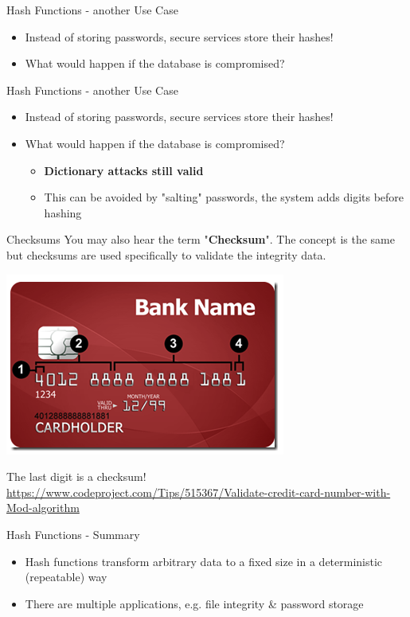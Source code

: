 \documentclass{beamer}
\begin{document}
\begin{frame}{Hash Functions - another Use Case}
\begin{itemize}
\item Instead of storing passwords, secure services store their hashes!
\item What would happen if the database is compromised?
\end{itemize}
\end{frame}

\begin{frame}{Hash Functions - another Use Case}
\begin{itemize}
\item Instead of storing passwords, secure services store their hashes!
\item What would happen if the database is compromised?
\begin{itemize}
\item \textbf{Dictionary attacks still valid}
\item This can be avoided by "salting" passwords, the system adds digits before hashing
\end{itemize}
\end{itemize}
\end{frame}

\begin{frame}{Checksums}
You may also hear the term "\textbf{Checksum}". The concept is the same but checksums are used specifically to validate the integrity data. 
\begin{center}
\includegraphics[width=0.45\linewidth]{credit-card.png} \newline
{\footnotesize The last digit is a checksum! \url{https://www.codeproject.com/Tips/515367/Validate-credit-card-number-with-Mod-algorithm} \par}
\end{center}
\end{frame}

\begin{frame}{Hash Functions - Summary}
\begin{itemize}
\item Hash functions transform arbitrary data to a fixed size in a deterministic (repeatable) way
\item There are multiple applications, e.g. file integrity \& password storage
\end{itemize}
\end{frame}
\end{document}
